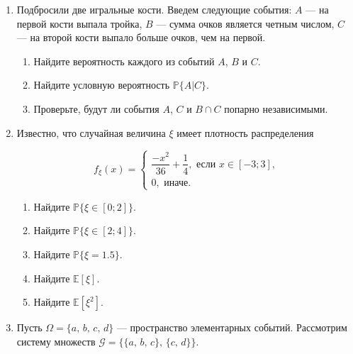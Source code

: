 \begin{enumerate}
\item Подбросили две игральные кости. 
Введем следующие события: $A$ — на первой кости выпала тройка, 
$B$ — сумма очков является четным числом, $C$ — на второй кости выпало больше очков, чем на первой.

\begin{enumerate}

    \item Найдите вероятность каждого из событий $A$, $B$ и  $C$.

    \item Найдите условную вероятность $\mathbb{P}\{A|C\}$.

    \item Проверьте, будут ли события $A$, $C$ и $B \cap C$ попарно независимыми.

\end{enumerate}

\item Известно, что случайная величина $\xi$ имеет плотность распределения

\[f_{\xi}(x) = 
\begin{cases}
\dfrac{-x^2}{36} + \dfrac{1}{4}, \text{ если } x \in [-3; 3], \\
0, \text{ иначе}.
\end{cases}
\]

    \begin{enumerate}

    \item Найдите $\mathbb{P}\{\xi \in [0; 2]\}$.

    \item Найдите $\mathbb{P}\{\xi \in [2; 4]\}$.

    \item Найдите $\mathbb{P}\{\xi = 1.5\}$.

    \item Найдите $\mathbb{E}[\xi]$.

    \item Найдите $\mathbb{E}[\xi^2]$.

\end{enumerate}


\item Пусть $\Omega = \{a, \, b, \, c, \, d\}$ — пространство элементарных событий. 
Рассмотрим систему множеств $\mathcal{G} = \bigl\{ \{a, \, b, \, c\}, \, \{c, \, d\}\bigr\}$.

\begin{enumerate}


\end{enumerate}
\end{enumerate}
